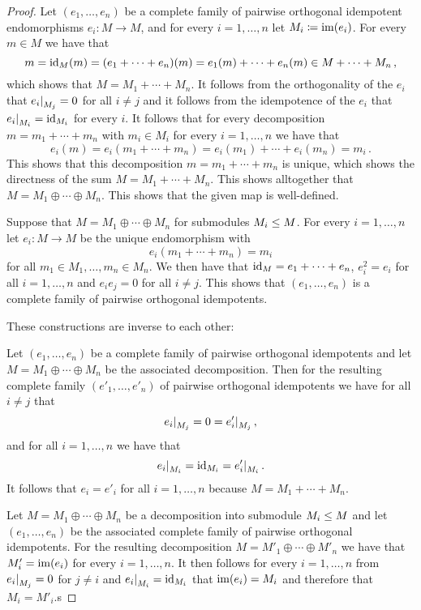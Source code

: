 \begin{proof}
  Let $(e_1, \dotsc, e_n)$ be a complete family of pairwise orthogonal idempotent endomorphisms $e_i \colon M \to M$, and for every $i = 1, \dotsc, n$ let $M_i \coloneqq \operatorname{im}(e_i)$.
  For every $m \in M$ we have that
  \[
        m
    =   \operatorname{id}_M(m)
    =   (e_1 + \dotsb + e_n)(m)
    =   e_1(m) + \dotsb + e_n(m)
    \in M + \dotsb + M_n \,,
  \]
  which shows that $M = M_1 + \dotsb + M_n$.
  It follows from the orthogonality of the $e_i$ that $\restrict{e_i}{M_j} = 0$ for all $i \neq j$ and it follows from the idempotence of the $e_i$ that $\restrict{e_i}{M_i} = \id_{M_i}$ for every $i$.
  It follows that for every decomposition $m = m_1 + \dotsb + m_n$ with $m_i \in M_i$ for every $i = 1, \dotsc, n$ we have that
  \[
      e_i(m)
    = e_i(m_1 + \dotsb + m_n)
    = e_i(m_1) + \dotsb + e_i(m_n)
    = m_i \,.
  \]
  This shows that this decomposition $m = m_1 + \dotsb + m_n$ is unique, which shows the directness of the sum $M = M_1 + \dotsb + M_n$.
  This shows alltogether that $M = M_1 \oplus \dotsb \oplus M_n$.
  This shows that the given map is well-defined.
  
  Suppose that $M = M_1 \oplus \dotsb \oplus M_n$ for submodules $M_i \leq M$.
  For every $i = 1, \dotsc, n$ let $e_i \colon M \to M$ be the unique endomorphism with
  \[
      e_i(m_1 + \dotsb + m_n)
    = m_i
  \]
  for all $m_1 \in M_1, \dotsc, m_n \in M_n$.
  We then have that $\operatorname{id}_M = e_1 + \dotsb + e_n$, $e_i^2 = e_i$ for all $i = 1, \dotsc, n$ and $e_i e_j = 0$ for all $i \neq j$.
  This shows that $(e_1, \dotsc, e_n)$ is a complete family of pairwise orthogonal idempotents.
  
  These constructions are inverse to each other:
  
  Let $(e_1, \dotsc, e_n)$ be a complete family of pairwise orthogonal idempotents and let $M = M_1 \oplus \dotsb \oplus M_n$ be the associated decomposition.
  Then for the resulting complete family $(e'_1, \dotsc, e'_n)$ of pairwise orthogonal idempotents we have for all $i \neq j$ that
  \[
      \restrict{e_i}{M_j}
    = 0
    = \restrict{e'_i}{M_j} \,,
  \]
  and for all $i = 1, \dotsc, n$ we have that
  \[
      \restrict{e_i}{M_i}
    = \id_{M_i}
    = \restrict{e'_i}{M_i} \,.
  \]
  It follows that $e_i = e'_i$ for all $i = 1, \dotsc, n$ because $M = M_1 + \dotsb + M_n$.
  
  Let $M = M_1 \oplus \dotsb \oplus M_n$ be a decomposition into submodule $M_i \leq M$ and let $(e_1, \dotsc, e_n)$ be the associated complete family of pairwise orthogonal idempotents.
  For the resulting decomposition $M = M'_1 \oplus \dotsb \oplus M'_n$ we have that $M'_i = \operatorname{im}(e_i)$ for every $i = 1, \dotsc, n$.
  It then follows for every $i = 1, \dotsc, n$ from $\restrict{e_i}{M_j} = 0$ for $j \neq i$ and $\restrict{e_i}{M_i} = \id_{M_i}$ that $\operatorname{im}(e_i) = M_i$ and therefore that $M_i = M'_i$.s
\end{proof}


